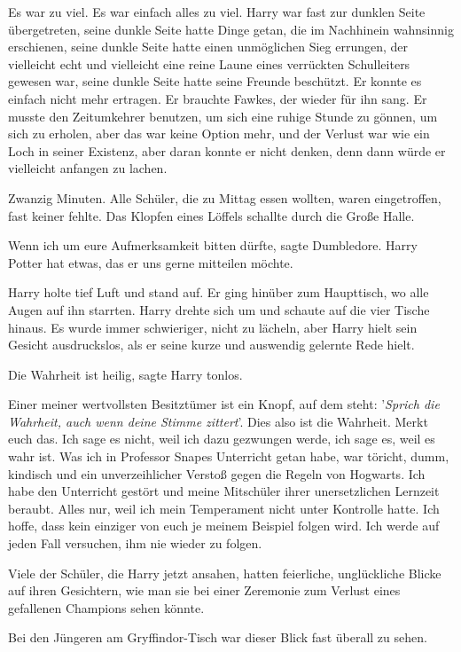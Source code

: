 Es war zu viel. Es war einfach alles zu viel. Harry war fast zur dunklen Seite
übergetreten, seine dunkle Seite hatte Dinge getan, die im Nachhinein wahnsinnig
erschienen, seine dunkle Seite hatte einen unmöglichen Sieg errungen, der
vielleicht echt und vielleicht eine reine Laune eines verrückten Schulleiters
gewesen war, seine dunkle Seite hatte seine Freunde beschützt. Er konnte es
einfach nicht mehr ertragen. Er brauchte Fawkes, der wieder für ihn sang. Er
musste den Zeitumkehrer benutzen, um sich eine ruhige Stunde zu gönnen, um sich
zu erholen, aber das war keine Option mehr, und der Verlust war wie ein Loch in
seiner Existenz, aber daran konnte er nicht denken, denn dann würde er
vielleicht anfangen zu lachen.

Zwanzig Minuten. Alle Schüler, die zu Mittag essen wollten, waren eingetroffen,
fast keiner fehlte. Das Klopfen eines Löffels schallte durch die Große Halle.

\glqq Wenn ich um eure Aufmerksamkeit bitten dürfte\grqq{}, sagte Dumbledore.
\glqq Harry Potter hat etwas, das er uns gerne mitteilen möchte.\grqq{}

Harry holte tief Luft und stand auf. Er ging hinüber zum Haupttisch, wo alle
Augen auf ihn starrten. Harry drehte sich um und schaute auf die vier Tische
hinaus. Es wurde immer schwieriger, nicht zu lächeln, aber Harry hielt sein
Gesicht ausdruckslos, als er seine kurze und auswendig gelernte Rede hielt.

\glqq Die Wahrheit ist heilig\grqq{}, sagte Harry tonlos.

\glqq Einer meiner wertvollsten Besitztümer ist ein Knopf, auf dem steht:
'\emph{Sprich die Wahrheit, auch wenn deine Stimme zittert}'. Dies also ist die
Wahrheit. Merkt euch das. Ich sage es nicht, weil ich dazu gezwungen werde, ich
sage es, weil es wahr ist. Was ich in Professor Snapes Unterricht getan habe,
war töricht, dumm, kindisch und ein unverzeihlicher Verstoß gegen die Regeln von
Hogwarts. Ich habe den Unterricht gestört und meine Mitschüler ihrer
unersetzlichen Lernzeit beraubt. Alles nur, weil ich mein Temperament nicht
unter Kontrolle hatte. Ich hoffe, dass kein einziger von euch je meinem Beispiel
folgen wird. Ich werde auf jeden Fall versuchen, ihm nie wieder zu
folgen.\grqq{}

Viele der Schüler, die Harry jetzt ansahen, hatten feierliche, unglückliche
Blicke auf ihren Gesichtern, wie man sie bei einer Zeremonie zum Verlust eines
gefallenen Champions sehen könnte.

Bei den Jüngeren am Gryffindor-Tisch war dieser Blick fast überall zu sehen.


